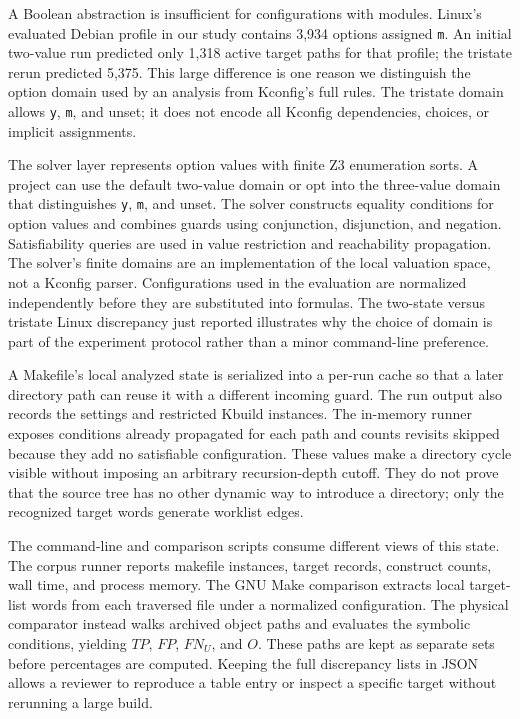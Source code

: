 \documentclass[acmsmall,screen,review]{acmart}
\begin{document}
A Boolean abstraction is insufficient for configurations with modules. Linux's evaluated Debian profile in our study contains 3,934 options assigned \texttt{m}. An initial two-value run predicted only 1,318 active target paths for that profile; the tristate rerun predicted 5,375. This large difference is one reason we distinguish the option domain used by an analysis from Kconfig's full rules. The tristate domain allows \texttt{y}, \texttt{m}, and unset; it does not encode all Kconfig dependencies, choices, or implicit assignments.


The solver layer represents option values with finite Z3 enumeration sorts. A project can use the default two-value domain or opt into the three-value domain that distinguishes \texttt{y}, \texttt{m}, and unset. The solver constructs equality conditions for option values and combines guards using conjunction, disjunction, and negation. Satisfiability queries are used in value restriction and reachability propagation. The solver's finite domains are an implementation of the local valuation space, not a Kconfig parser. Configurations used in the evaluation are normalized independently before they are substituted into formulas. The two-state versus tristate Linux discrepancy just reported illustrates why the choice of domain is part of the experiment protocol rather than a minor command-line preference.

A Makefile's local analyzed state is serialized into a per-run cache so that a later directory path can reuse it with a different incoming guard. The run output also records the settings and restricted Kbuild instances. The in-memory runner exposes conditions already propagated for each path and counts revisits skipped because they add no satisfiable configuration. These values make a directory cycle visible without imposing an arbitrary recursion-depth cutoff. They do not prove that the source tree has no other dynamic way to introduce a directory; only the recognized target words generate worklist edges.

The command-line and comparison scripts consume different views of this state. The corpus runner reports makefile instances, target records, construct counts, wall time, and process memory. The GNU Make comparison extracts local target-list words from each traversed file under a normalized configuration. The physical comparator instead walks archived object paths and evaluates the symbolic conditions, yielding $TP$, $FP$, $FN_U$, and $O$. These paths are kept as separate sets before percentages are computed. Keeping the full discrepancy lists in JSON allows a reviewer to reproduce a table entry or inspect a specific target without rerunning a large build.
\end{document}
